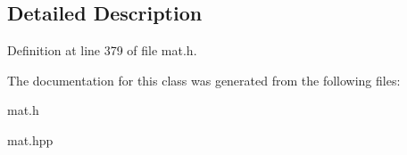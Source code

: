 \subsection{\-Detailed \-Description}


\-Definition at line 379 of file mat.\-h.



\-The documentation for this class was generated from the following files\-:\begin{DoxyCompactItemize}
\item 
mat.\-h\item 
mat.\-hpp\end{DoxyCompactItemize}

